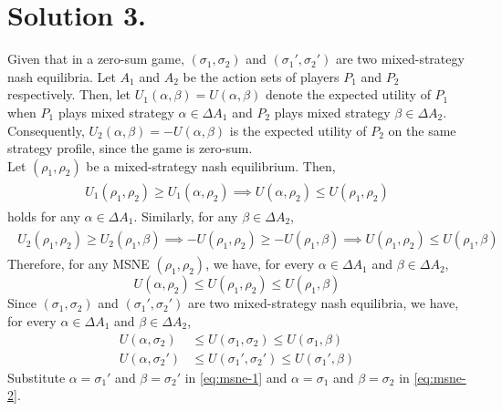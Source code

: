 \documentclass[9pt]{article}
\begin{document}
\section*{Solution 3.}
Given that in a zero-sum game, $(\sigma_{1}, \sigma_{2})$ and $(\sigma_{1}', \sigma_{2}')$ are two mixed-strategy nash equilibria.
Let $A_{1}$ and $A_{2}$ be the action sets of players $P_{1}$ and $P_{2}$ respectively.
Then, let $U_{1}(\alpha, \beta) = U(\alpha, \beta)$ denote the expected utility of $P_{1}$ when $P_{1}$ plays mixed strategy $\alpha \in \Delta A_{1}$ and $P_{2}$ plays mixed strategy $\beta \in \Delta A_{2}$.
Consequently, $U_{2}(\alpha, \beta) = -U(\alpha, \beta)$ is the expected utility of $P_{2}$ on the same strategy profile, since the game is zero-sum. \\
Let $(\rho_{1}, \rho_{2})$ be a mixed-strategy nash equilibrium.
Then,
\begin{align}
    \begin{split}
        U_{1}(\rho_{1}, \rho_{2}) \geq U_{1}(\alpha, \rho_{2})
        \implies U(\alpha, \rho_{2}) \leq U(\rho_{1}, \rho_{2})
    \end{split}
\end{align}
holds for any $\alpha \in \Delta A_{1}$.
Similarly, for any $\beta \in \Delta A_{2}$,
\begin{align}
    \begin{split}
        U_{2}(\rho_{1}, \rho_{2}) \geq U_{2}(\rho_{1}, \beta)
        \implies -U(\rho_{1}, \rho_{2}) \geq -U(\rho_{1}, \beta)
        \implies U(\rho_{1}, \rho_{2}) \leq U(\rho_{1}, \beta)
    \end{split}
\end{align}
Therefore, for any MSNE $(\rho_{1}, \rho_{2})$, we have, for every $\alpha \in \Delta A_{1}$ and $\beta \in \Delta A_{2}$,
\begin{equation}
    U(\alpha, \rho_{2}) \leq U(\rho_{1}, \rho_{2}) \leq U(\rho_{1}, \beta)
\end{equation}
Since $(\sigma_{1}, \sigma_{2})$ and $(\sigma_{1}', \sigma_{2}')$ are two mixed-strategy nash equilibria, we have, for every $\alpha \in \Delta A_{1}$ and $\beta \in \Delta A_{2}$,
\begin{align}
    \label{eq:msne-1}
    U(\alpha, \sigma_{2}) &\leq U(\sigma_{1}, \sigma_{2}) \leq U(\sigma_{1}, \beta) \\
    \label{eq:msne-2}
    U(\alpha, \sigma_{2}') &\leq U(\sigma_{1}', \sigma_{2}') \leq U(\sigma_{1}', \beta)
\end{align}
Substitute $\alpha = \sigma_{1}'$ and $\beta = \sigma_{2}'$ in \eqref{eq:msne-1} and $\alpha = \sigma_{1}$ and $\beta = \sigma_{2}$ in \eqref{eq:msne-2}.
\end{document}

